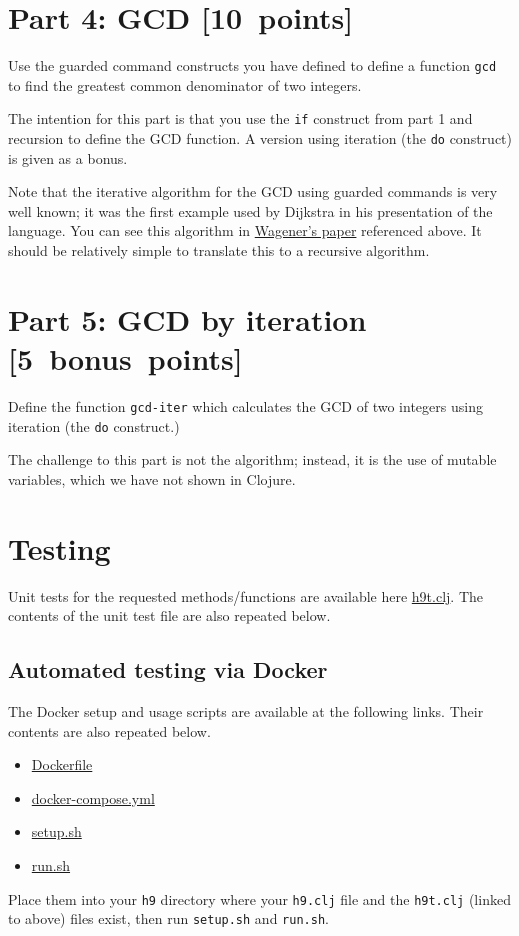 \documentclass[11pt]{article}
\begin{document}
\section*{Part 4: GCD                                                   [10 points]}
\label{sec:org764cbd0}
Use the guarded command constructs you have defined
to define a function \texttt{gcd} to find the greatest common denominator
of two integers.

The intention for this part is that you use the \texttt{if} construct
from part 1 and recursion to define the GCD function.
A version using iteration (the \texttt{do} construct) is given as a bonus.

Note that the iterative algorithm for the GCD using guarded commands is
very well known; it was the first example used by Dijkstra
in his presentation of the language.
You can see this algorithm in
\href{https://dl.acm.org/doi/10.5555/1074100.1074433}{Wagener's paper} referenced above.
It should be relatively simple to translate this to a recursive algorithm.

\section*{Part 5: GCD by iteration [5 bonus points]}
\label{sec:org4551217}
Define the function \texttt{gcd-iter} which calculates the GCD of two integers
using iteration (the \texttt{do} construct.)

The challenge to this part is not the algorithm;
instead, it is the use of mutable variables,
which we have not shown in Clojure.

\section*{Testing}
\label{sec:orge0abb5f}
Unit tests for the requested methods/functions
are available here \href{./testing/h9/h9t.clj}{h9t.clj}.
The contents of the unit test file are also repeated below.

\subsection*{Automated testing via Docker}
\label{sec:orgfdfd441}
The Docker setup and usage scripts are available at the following links.
Their contents are also repeated below.
\begin{itemize}
\item \href{./testing/h9/Dockerfile}{Dockerfile}
\item \href{./testing/h9/docker-compose.yml}{docker-compose.yml}
\item \href{./testing/h9/setup.sh}{setup.sh}
\item \href{./testing/h9/run.sh}{run.sh}
\end{itemize}
Place them into your \texttt{h9} directory where your \texttt{h9.clj} file
and the \texttt{h9t.clj} (linked to above) files exist,
then run \texttt{setup.sh} and \texttt{run.sh}.
\end{document}
